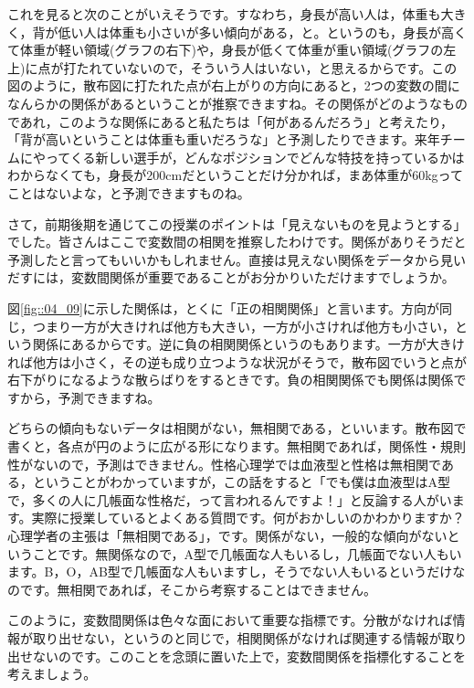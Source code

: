 \documentclass{ltjbook}
\begin{document}
これを見ると次のことがいえそうです。すなわち，身長が高い人は，体重も大きく，背が低い人は体重も小さいが多い傾向がある，と。というのも，身長が高くて体重が軽い領域(グラフの右下)や，身長が低くて体重が重い領域(グラフの左上)に点が打たれていないので，そういう人はいない，と思えるからです。この図のように，散布図に打たれた点が右上がりの方向にあると，2つの変数の間になんらかの関係があるということが推察できますね。その関係がどのようなものであれ，このような関係にあると私たちは「何があるんだろう」と考えたり，「背が高いということは体重も重いだろうな」と予測したりできます。来年チームにやってくる新しい選手が，どんなポジションでどんな特技を持っているかはわからなくても，身長が200cmだということだけ分かれば，まあ体重が60kgってことはないよな，と予測できますものね。

さて，前期後期を通じてこの授業のポイントは「見えないものを見ようとする」でした。皆さんはここで変数間の相関を推察したわけです。関係がありそうだと予測したと言ってもいいかもしれません。直接は見えない関係をデータから見いだすには，変数間関係が重要であることがお分かりいただけますでしょうか。

図\ref{fig::04_09}に示した関係は，とくに「正の相関関係」と言います。方向が同じ，つまり一方が大きければ他方も大きい，一方が小さければ他方も小さい，という関係にあるからです。逆に負の相関関係というのもあります。一方が大きければ他方は小さく，その逆も成り立つような状況がそうで，散布図でいうと点が右下がりになるような散らばりをするときです。負の相関関係でも関係は関係ですから，予測できますね。

どちらの傾向もないデータは相関がない，無相関である，といいます。散布図で書くと，各点が円のように広がる形になります。無相関であれば，関係性・規則性がないので，予測はできません。性格心理学では血液型と性格は無相関である，ということがわかっていますが，この話をすると「でも僕は血液型はA型で，多くの人に几帳面な性格だ，って言われるんですよ！」と反論する人がいます。実際に授業しているとよくある質問です。何がおかしいのかわかりますか？ 心理学者の主張は「無相関である」，です。関係がない，一般的な傾向がないということです。無関係なので，A型で几帳面な人もいるし，几帳面でない人もいます。B，O，AB型で几帳面な人もいますし，そうでない人もいるというだけなのです。無相関であれば，そこから考察することはできません。

このように，変数間関係は色々な面において重要な指標です。分散がなければ情報が取り出せない，というのと同じで，相関関係がなければ関連する情報が取り出せないのです。このことを念頭に置いた上で，変数間関係を指標化することを考えましょう。
\end{document}
